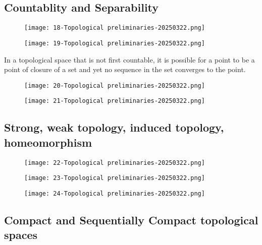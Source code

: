 \subsection{Countablity and Separability}

\begin{figure}[H]
\centering
\texttt{[image: 18-Topological preliminaries-20250322.png]}
\label{}
\end{figure}
\begin{figure}[H]
\centering
\texttt{[image: 19-Topological preliminaries-20250322.png]}
\label{}
\end{figure}

In a topological space that is not first countable, it is possible for a point to be a point of closure of a set and yet no sequence in the set converges to the point.

\begin{figure}[H]
\centering
\texttt{[image: 20-Topological preliminaries-20250322.png]}
\label{}
\end{figure}
\begin{figure}[H]
\centering
\texttt{[image: 21-Topological preliminaries-20250322.png]}
\label{}
\end{figure}

\subsection{Strong, weak topology, induced topology, homeomorphism}

\begin{figure}[H]
\centering
\texttt{[image: 22-Topological preliminaries-20250322.png]}
\label{}
\end{figure}
\begin{figure}[H]
\centering
\texttt{[image: 23-Topological preliminaries-20250322.png]}
\label{}
\end{figure}
\begin{figure}[H]
\centering
\texttt{[image: 24-Topological preliminaries-20250322.png]}
\label{}
\end{figure}

\subsection{Compact and Sequentially Compact topological spaces}

